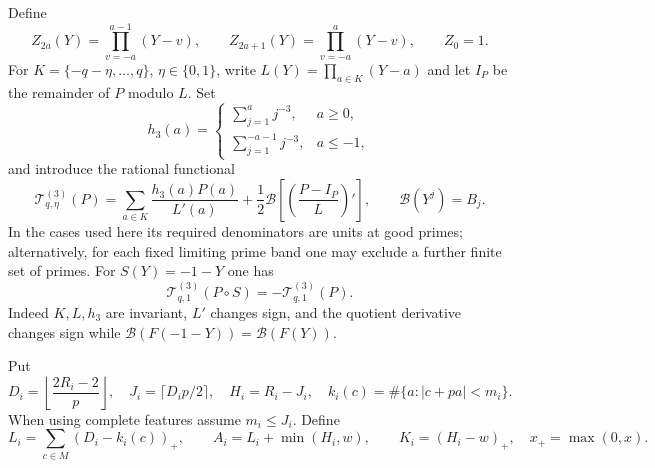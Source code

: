 \documentclass[11pt]{article}
\theoremstyle{definition}\newtheorem{definition}[theorem]{Definition}
\theoremstyle{remark}\newtheorem{remark}[theorem]{Remark}
\begin{document}
Define
\[
 Z_{2a}(Y)=\prod_{v=-a}^{a-1}(Y-v),\qquad
 Z_{2a+1}(Y)=\prod_{v=-a}^{a}(Y-v),\qquad Z_0=1.
\]
For $K=\{-q-\eta,\ldots,q\}$, $\eta\in\{0,1\}$, write
$L(Y)=\prod_{a\in K}(Y-a)$ and let $I_P$ be the remainder of $P$
modulo $L$. Set
\[
 h_3(a)=\begin{cases}\sum_{j=1}^a j^{-3},&a\ge0,\\
                         \sum_{j=1}^{-a-1}j^{-3},&a\le-1,
          \end{cases}
\]
and introduce the rational functional
\begin{equation}\label{zthree:universal}
 \mathcal T_{q,\eta}^{(3)}(P)=
 \sum_{a\in K}\frac{h_3(a)P(a)}{L'(a)}
 +\frac12\mathcal B\left[\left(\frac{P-I_P}{L}\right)'\right],
 \qquad \mathcal B(Y^j)=B_j.
\end{equation}
In the cases used here its required denominators are units at good
primes; alternatively, for each fixed limiting prime band one may
exclude a further finite set of primes.
For $S(Y)=-1-Y$ one has
\begin{equation}\label{zthree:parity}
 \mathcal T_{q,1}^{(3)}(P\circ S)
       =-\mathcal T_{q,1}^{(3)}(P).
\end{equation}
Indeed $K,L,h_3$ are invariant, $L'$ changes sign, and the quotient
derivative changes sign while $\mathcal B(F(-1-Y))=\mathcal B(F(Y))$.

Put
\begin{equation}\label{zthree:features}
 D_i=\left\lfloor\frac{2R_i-2}{p}\right\rfloor,\quad
 J_i=\lceil D_ip/2\rceil,\quad H_i=R_i-J_i,\quad
 k_i(c)=\#\{a:|c+pa|<m_i\}.
\end{equation}
When using complete features assume $m_i\le J_i$. Define
\begin{equation}\label{zthree:AK}
 L_i=\sum_{c\in M}(D_i-k_i(c))_+,\qquad
 A_i=L_i+\min(H_i,w),\qquad K_i=(H_i-w)_+,
 \quad x_+=\max(0,x).
\end{equation}
\end{document}

